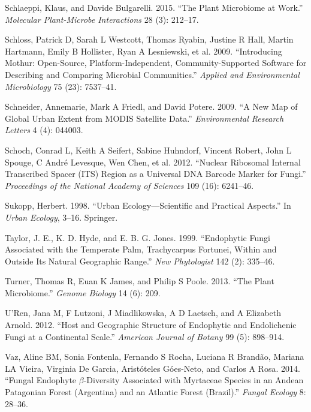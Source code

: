 \documentclass[fleqn,10pt,lineno]{wlpeerj} %
\newlength{\cslhangindent}
\newenvironment{CSLReferences}[2] %
 {%
  \setlength{\parindent}{0pt}
  \ifodd #1 \everypar{\setlength{\hangindent}{\cslhangindent}}\ignorespaces\fi
  \ifnum #2 > 0
  \setlength{\parskip}{#2\baselineskip}
  \fi
 }%
 {}
\begin{document}
\begin{CSLReferences}{1}{0}
\leavevmode{}%
Schlaeppi, Klaus, and Davide Bulgarelli. 2015. {``The Plant Microbiome
at Work.''} \emph{Molecular Plant-Microbe Interactions} 28 (3): 212--17.

\leavevmode{}%
Schloss, Patrick D, Sarah L Westcott, Thomas Ryabin, Justine R Hall,
Martin Hartmann, Emily B Hollister, Ryan A Lesniewski, et al. 2009.
{``Introducing Mothur: Open-Source, Platform-Independent,
Community-Supported Software for Describing and Comparing Microbial
Communities.''} \emph{Applied and Environmental Microbiology} 75 (23):
7537--41.

\leavevmode{}%
Schneider, Annemarie, Mark A Friedl, and David Potere. 2009. {``A New
Map of Global Urban Extent from MODIS Satellite Data.''}
\emph{Environmental Research Letters} 4 (4): 044003.

\leavevmode{}%
Schoch, Conrad L, Keith A Seifert, Sabine Huhndorf, Vincent Robert, John
L Spouge, C André Levesque, Wen Chen, et al. 2012. {``Nuclear Ribosomal
Internal Transcribed Spacer (ITS) Region as a Universal DNA Barcode
Marker for Fungi.''} \emph{Proceedings of the National Academy of
Sciences} 109 (16): 6241--46.

\leavevmode{}%
Sukopp, Herbert. 1998. {``Urban Ecology---Scientific and Practical
Aspects.''} In \emph{Urban Ecology}, 3--16. Springer.

\leavevmode{}%
Taylor, J. E., K. D. Hyde, and E. B. G. Jones. 1999. {``Endophytic Fungi
Associated with the Temperate Palm, Trachycarpus Fortunei, Within and
Outside Its Natural Geographic Range.''} \emph{New Phytologist} 142 (2):
335--46.

\leavevmode{}%
Turner, Thomas R, Euan K James, and Philip S Poole. 2013. {``The Plant
Microbiome.''} \emph{Genome Biology} 14 (6): 209.

\leavevmode{}%
U'Ren, Jana M, F Lutzoni, J Miadlikowska, A D Laetsch, and A Elizabeth
Arnold. 2012. {``Host and Geographic Structure of Endophytic and
Endolichenic Fungi at a Continental Scale.''} \emph{American Journal of
Botany} 99 (5): 898--914.

\leavevmode{}%
Vaz, Aline BM, Sonia Fontenla, Fernando S Rocha, Luciana R Brandão,
Mariana LA Vieira, Virginia De Garcia, Aristóteles Góes-Neto, and Carlos
A Rosa. 2014. {``Fungal Endophyte \(\beta\)-Diversity Associated with
Myrtaceae Species in an Andean Patagonian Forest (Argentina) and an
Atlantic Forest (Brazil).''} \emph{Fungal Ecology} 8: 28--36.


\end{CSLReferences}
\end{document}
